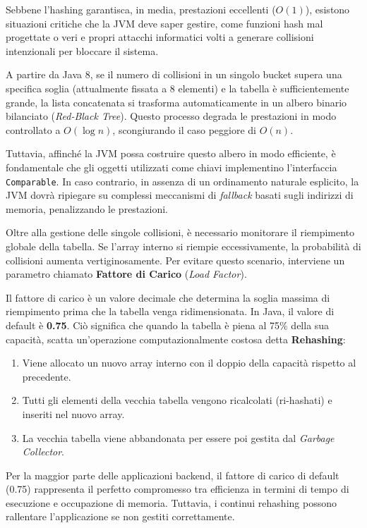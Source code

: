 Sebbene l'hashing garantisca, in media, prestazioni eccellenti ($O(1)$), esistono situazioni critiche che la JVM deve saper gestire, come funzioni hash mal progettate o veri e propri attacchi informatici volti a generare collisioni intenzionali per bloccare il sistema.

A partire da Java 8, se il numero di collisioni in un singolo bucket supera una specifica soglia (attualmente fissata a 8 elementi) e la tabella è sufficientemente grande, la lista concatenata si trasforma automaticamente in un albero binario bilanciato (\textit{Red-Black Tree}). Questo processo degrada le prestazioni in modo controllato a $O(\log n)$, scongiurando il caso peggiore di $O(n)$.

Tuttavia, affinché la JVM possa costruire questo albero in modo efficiente, è fondamentale che gli oggetti utilizzati come chiavi implementino l'interfaccia \texttt{Comparable}. In caso contrario, in assenza di un ordinamento naturale esplicito, la JVM dovrà ripiegare su complessi meccanismi di \textit{fallback} basati sugli indirizzi di memoria, penalizzando le prestazioni.

Oltre alla gestione delle singole collisioni, è necessario monitorare il riempimento globale della tabella. Se l'array interno si riempie eccessivamente, la probabilità di collisioni aumenta vertiginosamente. Per evitare questo scenario, interviene un parametro chiamato \textbf{Fattore di Carico} (\textit{Load Factor}).

Il fattore di carico è un valore decimale che determina la soglia massima di riempimento prima che la tabella venga ridimensionata. In Java, il valore di default è \textbf{0.75}. Ciò significa che quando la tabella è piena al 75\% della sua capacità, scatta un'operazione computazionalmente costosa detta \textbf{Rehashing}:
\begin{enumerate}
    \item Viene allocato un nuovo array interno con il doppio della capacità rispetto al precedente.
    \item Tutti gli elementi della vecchia tabella vengono ricalcolati (ri-hashati) e inseriti nel nuovo array.
    \item La vecchia tabella viene abbandonata per essere poi gestita dal \textit{Garbage Collector}.
\end{enumerate}

Per la maggior parte delle applicazioni backend, il fattore di carico di default (0.75) rappresenta il perfetto compromesso tra efficienza in termini di tempo di esecuzione e occupazione di memoria. Tuttavia, i continui rehashing possono rallentare l'applicazione se non gestiti correttamente.

